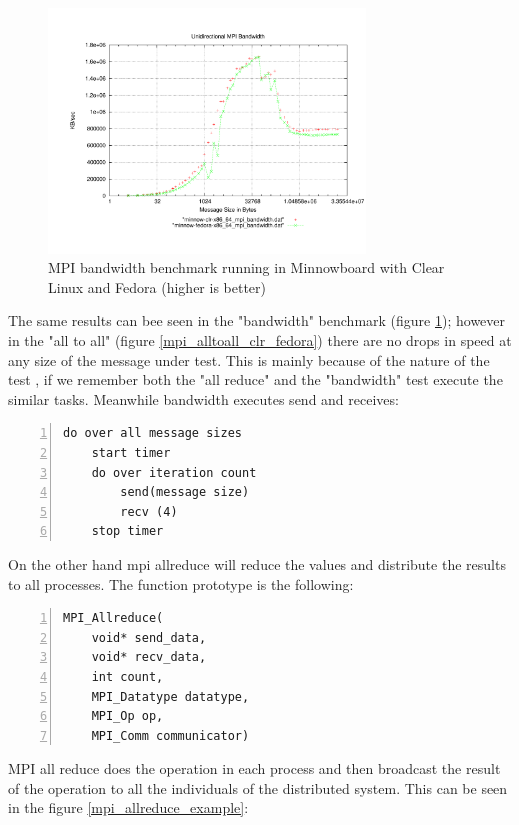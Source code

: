 \begin{figure}[H]
\centering
\includegraphics[width=0.75\textwidth]{images/mpbench_clr_experiments/mpi_bandwidth.pdf}
\caption{MPI bandwidth benchmark running in Minnowboard with Clear Linux and
Fedora (higher is better)}
\label{mpi_bandwidth_clr_fedora}
\end{figure}

The same results can bee seen in the "bandwidth" benchmark (figure
\ref{mpi_bandwidth_clr_fedora}); however in the "all to all" (figure
\ref{mpi_alltoall_clr_fedora}) there are no drops in speed at any size of the
message under test.  This is mainly because of the nature of the test , if we
remember both the "all reduce" and the "bandwidth" test execute the similar
tasks. Meanwhile bandwidth executes send and receives: 

\begin{lstlisting}[frame=single,numbers=left]
do over all message sizes 
    start timer
    do over iteration count 
        send(message size) 
        recv (4)
    stop timer
\end{lstlisting}

On the other hand mpi allreduce will reduce the values and distribute the
results to all processes. The function prototype is the following:

\begin{lstlisting}[frame=single,numbers=left]
MPI_Allreduce(
    void* send_data,
    void* recv_data,
    int count,
    MPI_Datatype datatype,
    MPI_Op op,
    MPI_Comm communicator)
\end{lstlisting}

MPI all reduce does the operation in each process and then broadcast the result
of the operation to all the individuals of the distributed system. This can be
seen in the figure \ref{mpi_allreduce_example}: 

